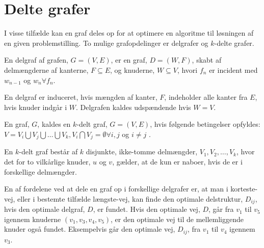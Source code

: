 \section{Delte grafer}
I visse tilfælde kan en graf deles op for at optimere en algoritme til løsningen af en given problemstilling.
To mulige grafopdelinger er delgrafer og $k$-delte grafer.

\begin{defn}[Delgraf] \label{defn:delgraf} %
En delgraf af grafen, $G= (V,E)$, er en graf, $D = (W,F)$, skabt af delmængderne af kanterne, $F \subseteq E$, og knuderne, $W \subseteq V$, hvori $f_n$ er incident med $w_{n-1}$ og $w_n \forall f_n$.
\end{defn}

En delgraf er induceret, hvis mængden af kanter, $F$, indeholder alle kanter fra $E$, hvis knuder indgår i $W$.
Delgrafen kaldes udspændende hvis $W=V$. 

\begin{defn}[K-delt] \label{defn:k-delt} %
En graf, $G$, kaldes en $k$-delt graf, $G = (V, E)$, hvis følgende betingelser opfyldes: $V= V_i \bigcup V_j \bigcup \dotsc \bigcup V_k, V_i \bigcap V_j  = \emptyset \forall i,j$ og $i\neq j$ .
\end{defn}

En $k$-delt graf består af $k$ disjunkte, ikke-tomme delmængder, $V_1, V_2, \ldots, V_k$, hvor det for to vilkårlige knuder, $u$ og $v$, gælder, at de kun er naboer, hvis de er i forskellige delmængder.


En af fordelene ved at dele en graf op i forskellige delgrafer er, at man i korteste-vej, eller i bestemte tilfælde længste-vej, kan finde den optimale delstruktur, $D_{ij}$, hvis den optimale delgraf, $D$, er fundet. Hvis den optimale vej, $D$, går fra $v_1$ til $v_5$ igennem knuderne $(v_1, v_3, v_4, v_5)$, er den optimale vej til de mellemliggende knuder også fundet. Eksempelvis går den optimale vej, $D_{ij}$, fra $v_1$ til $v_4$ igennem $v_3$.


